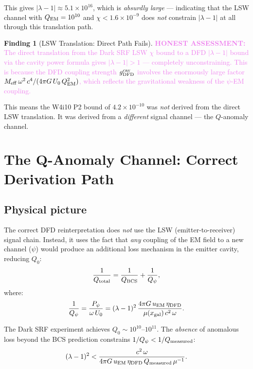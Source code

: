 \documentclass[11pt]{article}
\newcommand{\lam}{\lambda}
\newcommand{\lbone}{|\lambda - 1|}
\newcommand{\Meff}{M_{\rm eff}}
\newcommand{\ee}[1]{\times 10^{#1}}
\newcommand{\QEM}{Q_{\rm EM}}
\newcommand{\honest}[1]{\textcolor{violet}{\textbf{HONEST ASSESSMENT:} #1}}
\theoremstyle{definition}
\newtheorem{finding}[theorem]{Finding}
\theoremstyle{remark}
\begin{document}
This gives $\lbone \approx 5.1\ee{16}$, which is \emph{absurdly large}
--- indicating that the LSW channel with $\QEM = 10^{10}$ and
$\chi < 1.6\ee{-9}$ does \emph{not} constrain $\lbone$ at all
through this translation path.

\begin{finding}[LSW Translation: Direct Path Fails]
\label{find:lsw_fails}
\honest{The direct translation from the Dark SRF LSW $\chi$ bound to
a DFD $\lbone$ bound via the cavity power formula gives $\lbone > 1$
--- completely unconstraining. This is because the DFD coupling
strength $g_{\rm DFD}^{\rm cav}$ involves the enormously large factor
$\Meff\,\omega^2\,c^4/(4\pi G\,U_0\,\QEM^2)$, which reflects the
gravitational weakness of the $\psi$-EM coupling.}

This means the W4i10 P2 bound of $4.2\ee{-10}$ was \emph{not}
derived from the direct LSW translation. It was derived from a
\emph{different} signal channel --- the $Q$-anomaly channel.
\end{finding}


\section{The Q-Anomaly Channel: Correct Derivation Path}
\label{sec:q_anomaly}

\subsection{Physical picture}

The correct DFD reinterpretation does \emph{not} use the LSW
(emitter-to-receiver) signal chain. Instead, it uses the fact that
\emph{any} coupling of the EM field to a new channel ($\psi$) would
produce an additional loss mechanism in the emitter cavity, reducing
$Q_0$:
\begin{equation}
\frac{1}{Q_{\rm total}} = \frac{1}{Q_{\rm BCS}} + \frac{1}{Q_\psi},
\label{eq:Q_total}
\end{equation}
where:
\begin{equation}
\frac{1}{Q_\psi} = \frac{P_\psi}{\omega\,U_0}
= (\lam-1)^2\,\frac{4\pi G\,u_{\rm EM}\,\eta_{\rm DFD}}
{\mu(x_{\rm gal})\,c^2\,\omega}.
\label{eq:Q_psi}
\end{equation}

The Dark SRF experiment achieves $Q_0 \sim 10^{10}$--$10^{11}$.
The \emph{absence} of anomalous loss beyond the BCS prediction
constrains $1/Q_\psi < 1/Q_{\rm measured}$:
\begin{equation}
(\lam-1)^2 < \frac{c^2\,\omega}{4\pi G\,u_{\rm EM}\,\eta_{\rm DFD}
\,Q_{\rm measured}\,\mu^{-1}}.
\label{eq:Q_bound}
\end{equation}
\end{document}
